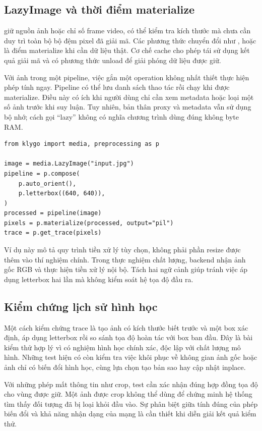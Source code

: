 \subsection{LazyImage và thời điểm materialize}
 giữ nguồn ảnh hoặc chỉ số frame video, có thể kiểm tra kích thước mà chưa cần duy trì toàn bộ bộ đệm pixel đã giải mã. Các phương thức chuyển đổi như ,  hoặc  là điểm materialize khi cần dữ liệu thật. Cơ chế cache cho phép tái sử dụng kết quả giải mã và có phương thức unload để giải phóng dữ liệu được giữ.

Với ảnh trong một pipeline, việc gắn một operation không nhất thiết thực hiện phép tính ngay. Pipeline có thể lưu danh sách thao tác rồi chạy khi được materialize. Điều này có ích khi người dùng chỉ cần xem metadata hoặc loại một số ảnh trước khi suy luận. Tuy nhiên, bản thân proxy và metadata vẫn sử dụng bộ nhớ; cách gọi ``lazy'' không có nghĩa chương trình dùng đúng không byte RAM.

\begin{lstlisting}[caption={Gắn tiền xử lý qua API công khai}]
from klygo import media, preprocessing as p

image = media.LazyImage("input.jpg")
pipeline = p.compose(
    p.auto_orient(),
    p.letterbox((640, 640)),
)
processed = pipeline(image)
pixels = p.materialize(processed, output="pil")
trace = p.get_trace(pixels)
\end{lstlisting}

Ví dụ này mô tả quy trình tiền xử lý tùy chọn, không phải phần resize được thêm vào thí nghiệm chính. Trong thực nghiệm chất lượng, backend nhận ảnh gốc RGB và thực hiện tiền xử lý nội bộ. Tách hai ngữ cảnh giúp tránh việc áp dụng letterbox hai lần mà không kiểm soát hệ tọa độ đầu ra.

\subsection{Kiểm chứng lịch sử hình học}
Một cách kiểm chứng trace là tạo ảnh có kích thước biết trước và một box xác định, áp dụng letterbox rồi so sánh tọa độ hoàn tác với box ban đầu. Đây là bài kiểm thử hợp lý vì có nghiệm hình học chính xác, độc lập với chất lượng mô hình. Những test hiện có còn kiểm tra việc khôi phục về không gian ảnh gốc hoặc ảnh chỉ có biến đổi hình học, cùng lựa chọn tạo bản sao hay cập nhật inplace.

Với những phép mất thông tin như crop, test cần xác nhận đúng hợp đồng tọa độ cho vùng được giữ. Một ảnh được crop không thể dùng để chứng minh hệ thống tìm thấy đối tượng đã bị loại khỏi đầu vào. Sự phân biệt giữa tính đúng của phép biến đổi và khả năng nhận dạng của mạng là cần thiết khi diễn giải kết quả kiểm thử.

